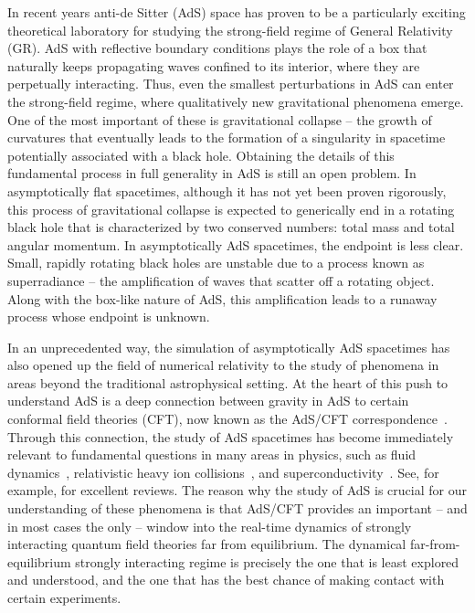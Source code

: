 \documentclass[aps,letterpaper,twocolumn,nofootinbib]{revtex4}
\numberwithin{equation}{section}
\begin{document}
In recent years anti-de Sitter (AdS) space has proven to be a particularly exciting theoretical laboratory for studying the strong-field regime of General Relativity (GR).
AdS with reflective boundary conditions plays the role of a box that naturally keeps propagating waves confined to its interior, where they are perpetually interacting.
Thus, even the smallest perturbations in AdS can enter the strong-field regime, where qualitatively new gravitational phenomena emerge.
One of the most important of these is gravitational collapse -- the growth of curvatures that eventually leads to the formation of a singularity in spacetime potentially associated with a black hole.
Obtaining the details of this fundamental process in full generality in AdS is still an open problem. 
In asymptotically flat spacetimes, although it has not yet been proven rigorously, this process of gravitational collapse is expected to generically end in a rotating black hole that is characterized by two conserved numbers: total mass and total angular momentum. 
In asymptotically AdS spacetimes, the endpoint is less clear.
Small, rapidly rotating black holes are unstable due to a process known as superradiance -- the amplification of waves that scatter off a rotating object. Along with the box-like nature of AdS, this amplification leads to a runaway process whose endpoint is unknown. 

In an unprecedented way, the simulation of asymptotically AdS spacetimes has also opened up the field of numerical relativity to the study of phenomena in areas beyond the traditional astrophysical setting.
At the heart of this push to understand AdS is a deep connection between gravity in AdS to certain conformal field theories (CFT), now known as the AdS/CFT correspondence~\cite{Maldacena:1997re,Gubser:1998bc,Witten:1998qj}. 
Through this connection, the study of AdS spacetimes has become immediately relevant to fundamental questions in many areas in physics, such as fluid dynamics~\cite{Baier:2007ix,Bhattacharyya:2010owp,Hubeny:2011hd}, relativistic heavy ion collisions~\cite{Chesler:2010bi,Casalderrey-Solana:2013aba,Casalderrey-Solana:2013sxa,Chesler:2015wra}, and superconductivity~\cite{Gubser:2008px,Hartnoll:2008kx,Hartnoll:2008vx}.
See, for example, \cite{CasalderreySolana:2011us,Chesler:2015lsa,Zaanen:2015oix,Hartnoll:2016apf} for excellent reviews. 
The reason why the study of AdS is crucial for our understanding of these phenomena is that AdS/CFT provides an important -- and in most cases the only -- window into the real-time dynamics of strongly interacting quantum field theories far from equilibrium. 
The dynamical far-from-equilibrium strongly interacting regime is precisely the one that is least explored and understood, and the one that has the best chance of making contact with certain experiments.
\end{document}

